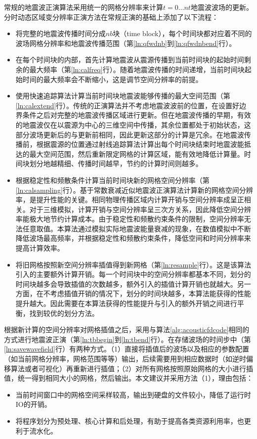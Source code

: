 常规的地震波正演算法采用统一的网格分辨率来计算$t=0\ldots nt$地震波波场的更新。分时动态区域变分辨率正演方法在常规正演的基础上添加了以下流程：
\begin{itemize}
  \item 将完整的地震波传播时间分成$nb$块（time block），每个时间块都对应着不同的波场网格分辨率和地震波传播范围（第\ref{ln:qfwdnb}到\ref{ln:qfwdnbend}行）。
  \item 在每个时间块的内部，首先计算地震波从震源传播到当前时间块的起始时间剩余的最大频率（第\ref{ln:calfreq}行）。随着地震波传播的时间递增，当前时间块起始时间的最大频率会不断缩小，这是调节空间分辨率的前提。
  \item 使用快速追踪算法\cite{um1987fast}计算当前时间块地震波能够传播的最大空间范围（第\ref{ln:calextend}行）。传统的正演算法并不考虑地震波波前的位置，在设置好边界条件之后对完整的地震波传播区域进行更新。但在地震波传播的早期，有效的地震波仅在以震源为中心的三维空间中传播，其余位置都处于初始状态，这部分波场更新后的与更新前相同，因此更新这部分的计算是冗余。在地震波传播前，根据震源的位置通过射线追踪算法计算出每个时间块结束时地震波能抵达的最大空间范围，然后重新限定网格的计算区域，能有效地降低计算量。时间块划分地越精细、传播时间越早，节约的计算时间则越多。
  \item 根据稳定性和频散条件计算当前时间块新的网格空间分辨率（第\ref{ln:calsampling}行）。基于常数衰减近似地震波正演算法计算新的网格空间分辨率，是提升性能的关键。相同物理传播区域内计算开销与空间分辨率成呈正相关。对于三维模拟，计算开销与空间分辨率呈三次方关系，因此降低空间分辨率能极大地节约计算成本。由于稳定性和频散约束条件的限制，空间分辨率无法任意取值。本算法通过模拟实际地震波能量衰减的现象，在数值模拟中不断降低波场最高频率，并根据稳定性和频散约束条件，降低空间和时间分辨率来提高计算效率。
  \item 将旧网格按照新空间分辨率插值得到新网格（第\ref{ln:resample}行）。这是该算法引入的主要额外计算开销。每一个时间块中的空间分辨率都基本不同，划分的时间块越多会导致插值的次数越多，额外引入的插值计算开销也就越大。另一方面，在不考虑插值开销的情况下，划分的时间块越多，本算法能获得的性能提升越大。因此需要在本算法获得的性能提升与引入的额外开销之间进行平衡，找到较优的划分方法。
\end{itemize}

根据新计算的空间分辨率对网格插值之后，采用与算法\ref{alg:acousticfdcode}相同的方式进行地震波正演（第\ref{ln:tbbegin}到\ref{ln:tbend}行）。在存储波场的时间步中（第\ref{ln:savewavefield}行）有两种方式。（1）直接将插值后的波场以及相应的参数配置（如当前网格分辨率，网格范围等等）输出，后续需要用到相应数据时（如逆时偏移算法或者可视化）再重新进行插值；（2）对所有网格按照原始网格的大小进行插值，统一得到相同大小的网格，然后输出。本文建议并采用方法（1），理由包括：
\begin{itemize}
  \item 当前时间窗口中的网格空间采样较高，输出到硬盘的文件较小，降低了运行时IO的开销。
  \item 将程序划分为预处理、核心计算和后处理，有助于提高各类资源利用率，也更利于流水化。
\end{itemize}

